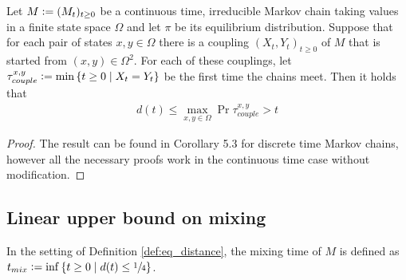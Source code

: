 


\begin{theorem}\label{thm:equilibrium_distance}
Let $M \vcentcolon= (M_t)_{t \geq 0}$ be a continuous time, irreducible Markov chain taking values in a finite state space $\Omega$ and let $\pi$ be its equilibrium distribution. Suppose that for each pair of states $x,y \in \Omega$ there is a coupling $(X_t, Y_t)_{t \geq 0}$ of $M$ that is started from $(x,y) \in \Omega^2$. For each of these couplings, let $\tau^{x, y}_{couple} \vcentcolon= \min\left\{t \geq 0 \mid X_t = Y_t \right\}$ be the first time the chains meet. Then it holds that 
\begin{align}
d(t) \leq \max\limits_{x,y \in \Omega} \Pr{\tau^{x, y}_{couple} > t}
\end{align}
\end{theorem}

\begin{proof}
The result can be found in \cite{levin2017markov} Corollary 5.3 for discrete time Markov chains, however all the necessary proofs work in the continuous time case without modification. 
\end{proof}

\subsection{Linear upper bound on mixing}
\begin{definition}
In the setting of Definition \ref{def:eq_distance}, the mixing time of $M$ is defined as $t_{mix} \vcentcolon= \inf\left\{ t \geq 0 \mid d(t) \leq \sfrac{1}{4} \right\}$. 
\end{definition}

